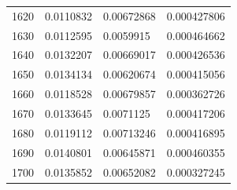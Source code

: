 \begin{center}
\begin{longtable}{l|l|l|l}
1620                                                   & 0.0110832                                                         & 0.00672868                                               & 0.000427806                                                        \\
1630                                                   & 0.0112595                                                         & 0.0059915                                                & 0.000464662                                                        \\
1640                                                   & 0.0132207                                                         & 0.00669017                                               & 0.000426536                                                        \\
1650                                                   & 0.0134134                                                         & 0.00620674                                               & 0.000415056                                                        \\
1660                                                   & 0.0118528                                                         & 0.00679857                                               & 0.000362726                                                        \\
1670                                                   & 0.0133645                                                         & 0.0071125                                                & 0.000417206                                                        \\
1680                                                   & 0.0119112                                                         & 0.00713246                                               & 0.000416895                                                        \\
1690                                                   & 0.0140801                                                         & 0.00645871                                               & 0.000460355                                                        \\
1700                                                   & 0.0135852                                                         & 0.00652082                                               & 0.000327245                                                        \\

\end{longtable}
\end{center}

